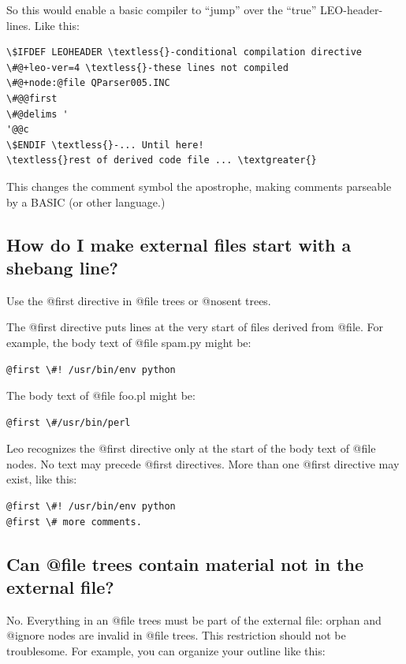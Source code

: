 \documentclass[a4paper,10pt,english]{sphinxmanual}
\begin{document}
So this would enable a basic compiler to ``jump'' over the ``true'' LEO-header-lines.
Like this:

\begin{Verbatim}[commandchars=\\\{\}]
\$IFDEF LEOHEADER \textless{}-conditional compilation directive
\#@+leo-ver=4 \textless{}-these lines not compiled
\#@+node:@file QParser005.INC
\#@@first
\#@delims '
'@@c
\$ENDIF \textless{}-... Until here!
\textless{}rest of derived code file ... \textgreater{}
\end{Verbatim}

This changes the comment symbol the apostrophe,
making comments parseable by a BASIC (or other language.)


\subsection{How do I make external files start with a shebang line?}
\label{FAQ:how-do-i-make-external-files-start-with-a-shebang-line}
Use the @first directive in @file trees or @nosent trees.

The @first directive puts lines at the very start of files derived from @file.
For example, the body text of @file spam.py might be:

\begin{Verbatim}[commandchars=\\\{\}]
@first \#! /usr/bin/env python
\end{Verbatim}

The body text of @file foo.pl might be:

\begin{Verbatim}[commandchars=\\\{\}]
@first \#/usr/bin/perl
\end{Verbatim}

Leo recognizes the @first directive only at the start of the body text of @file nodes.
No text may precede @first directives.
More than one @first directive may exist, like this:

\begin{Verbatim}[commandchars=\\\{\}]
@first \#! /usr/bin/env python
@first \# more comments.
\end{Verbatim}


\subsection{Can @file trees contain material not in the external file?}
\label{FAQ:can-file-trees-contain-material-not-in-the-external-file}
No. Everything in an @file trees must be part of the external file: orphan and
@ignore nodes are invalid in @file trees. This restriction should not be
troublesome. For example, you can organize your outline like this:
\end{document}
